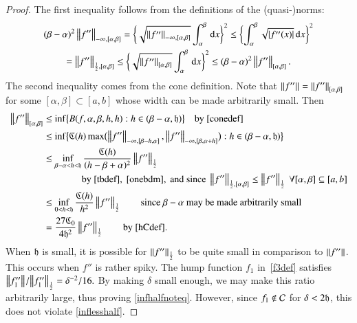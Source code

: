 \documentclass[review]{elsarticle}
\theoremstyle{definition}
\begin{document}
\begin{proof}
The first inequality follows from the definitions of the (quasi-)norms:
\begin{multline} \label{onebdm}
 (\beta - \alpha)^2 \norm[-\infty,{[\alpha,\beta]}]{f''} = \biggl\{\sqrt{\norm[-\infty,{[\alpha,\beta]}]{f''}}  \int_{\alpha}^{\beta} \, \dif x \biggr\}^2 \le 
 \biggl\{ \int_{\alpha}^{\beta} \sqrt{\abs{f''(x)}} \, \dif x \biggr\}^2\\
 = \norm[\frac 12,{[\alpha,\beta]}]{f''} \le\biggl\{\sqrt{\norm[{[\alpha,\beta]}]{f''}}  \int_{\alpha}^{\beta} \, \dif x \biggr\}^2 \le  (\beta - \alpha)^2 \norm[{[\alpha,\beta]}]{f''}.
\end{multline}
The second inequality comes from the cone definition.  Note that $\norm{f''}  = \norm[{[\alpha,\beta]}]{f''}$  for some $[\alpha,\beta] \subset [a,b]$ whose width can be made arbitrarily small.  Then
\begin{align*}
\norm[{[\alpha,\beta]}]{f''}
& \le \inf\bigl\{B(f,\alpha,\beta,h,h) : h \in (\beta - \alpha,\fh) \bigr \} \quad \text{by}~\eqref{conedef} \\
& \le  \inf\bigl\{\fC(h) \max\bigl(\norm[-\infty,{[\beta - h, \alpha]}]{f''},\norm[-\infty,{[\beta, \alpha+h]}]{f''}\bigr) : h \in (\beta - \alpha,\fh) \bigr \} \\
& \le \inf_{\beta - \alpha < h < \fh} \frac{\fC(h)}{(h-\beta+\alpha)^2}\norm[\frac 12]{f''} \\
& \qquad \qquad\text{by}~\eqref{tbdef},~\eqref{onebdm}, \text{ and since }  \norm[{\frac12,[\alpha,\beta]}]{f''} \le \norm[\frac 12]{f''} \ \forall [\alpha,\beta] \subseteq [a,b] \\
& \le \inf_{0 < h < \fh} \frac{\fC(h)}{h^2}\norm[\frac 12]{f''} \qquad \text{since $\beta-\alpha$ may be made arbitrarily small}\\
& = \frac{27\fC_0}{4\fh^2}\norm[\frac 12]{f''} \qquad \text{by \eqref{hCdef}}.
\end{align*}
When $\fh$ is small, it is possible for $\norm[\frac 12]{f''} $ to be quite
small in comparison to $\norm{f''}$. This occurs when $f''$ is rather spiky.
The hump function $f_1$ in~\eqref{f3def}  satisfies
$
 {\norm{f_1''}}/{\norm[\frac 12]{f_1''}}  =  { \delta^{-2}}/{16}.
$
By making $\delta$ small enough, we may make this ratio arbitrarily large, thus proving \eqref{infhalfnoteq}. However, since $f_1
\notin \cc$ for $\delta < 2\fh$, this does not violate \eqref{inflesshalf}.
\end{proof}

\end{document}
